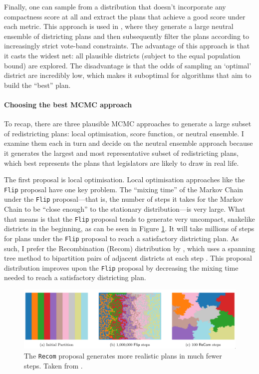 \documentclass[]{article}
\let\oldparagraph\paragraph
\renewcommand{\paragraph}[1]{\oldparagraph{#1}\mbox{}}
\begin{document}
Finally, one can sample from a distribution that doesn't incorporate any
compactness score at all and extract the plans that achieve a good score
under each metric. This approach is used in \cite{ddj2019comp}, where
they generate a large neutral ensemble of districting plans and then
subsequently filter the plans according to increasingly strict vote-band
constraints. The advantage of this approach is that it casts the widest
net: all plausible districts (subject to the equal population bound) are
explored. The disadvantage is that the odds of sampling an `optimal'
district are incredibly low, which makes it suboptimal for algorithms
that aim to build the ``best'' plan.

\hypertarget{choosing-the-best-mcmc-approach}{%
\paragraph{Choosing the best MCMC
approach}\label{choosing-the-best-mcmc-approach}}

To recap, there are three plausible MCMC approaches to generate a large
subset of redistricting plans: local optimisation, score function, or
neutral ensemble. I examine them each in turn and decide on the neutral
ensemble approach because it generates the largest and most
representative subset of redistricting plans, which best represents the
plans that legislators are likely to draw in real life.

The first proposal is local optimisation. Local optimisation approaches
like the \texttt{Flip} proposal have one key problem. The ``mixing
time'' of the Markov Chain under the \texttt{Flip} proposal---that is,
the number of steps it takes for the Markov Chain to be ``close enough''
to the stationary distribution---is very large. What that means is that
the \texttt{Flip} proposal tends to generate very uncompact, snakelike
districts in the beginning, as can be seen in Figure
\ref{recom_vs_flip}. It will take millions of steps for plans under the
\texttt{Flip} proposal to reach a satisfactory districting plan. As
such, I prefer the Recombination (Recom) distribution by
\citeauthor{ddj2019recom}, which uses a spanning tree method to
bipartition pairs of adjacent districts at each step
\citep{ddj2019comp}. This proposal distribution improves upon the
\texttt{Flip} proposal by decreasing the mixing time needed to reach a
satisfactory districting plan.

\begin{figure}
\centering
\includegraphics{img/recom_vs_flip.png}
\caption{\label{recom_vs_flip} The \texttt{Recom} proposal generates
more realistic plans in much fewer steps. Taken from
\cite{ddj2019recom}.}
\end{figure}
\end{document}
